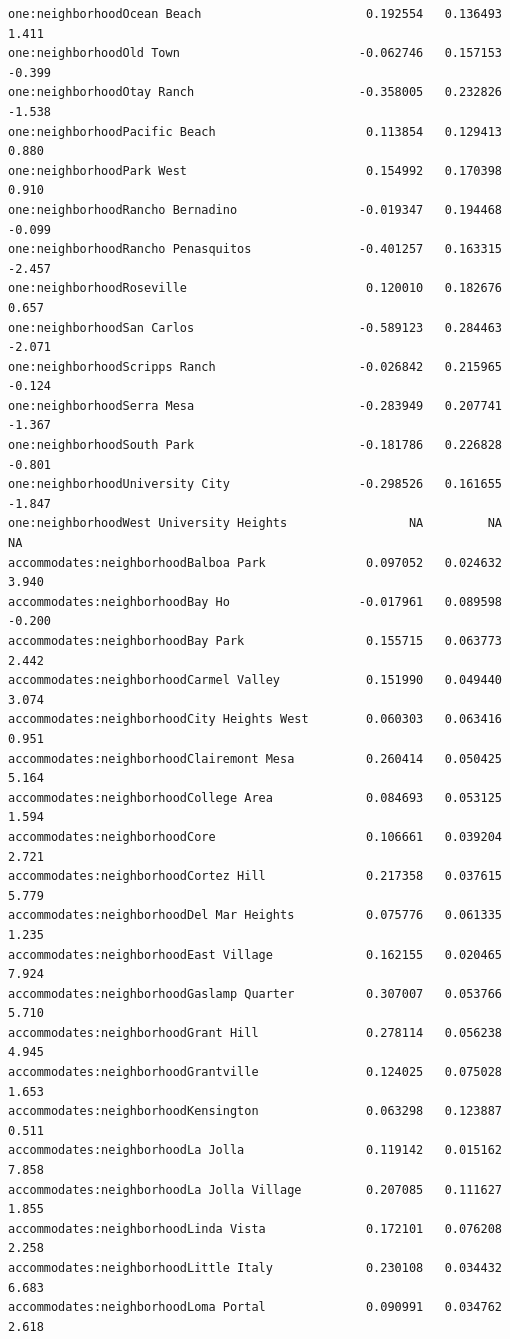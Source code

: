 \documentclass[
  letterpaper,
  DIV=11,
  numbers=noendperiod,
  oneside]{scrreprt}
\begin{document}
\begin{verbatim}
one:neighborhoodOcean Beach                       0.192554   0.136493   1.411
one:neighborhoodOld Town                         -0.062746   0.157153  -0.399
one:neighborhoodOtay Ranch                       -0.358005   0.232826  -1.538
one:neighborhoodPacific Beach                     0.113854   0.129413   0.880
one:neighborhoodPark West                         0.154992   0.170398   0.910
one:neighborhoodRancho Bernadino                 -0.019347   0.194468  -0.099
one:neighborhoodRancho Penasquitos               -0.401257   0.163315  -2.457
one:neighborhoodRoseville                         0.120010   0.182676   0.657
one:neighborhoodSan Carlos                       -0.589123   0.284463  -2.071
one:neighborhoodScripps Ranch                    -0.026842   0.215965  -0.124
one:neighborhoodSerra Mesa                       -0.283949   0.207741  -1.367
one:neighborhoodSouth Park                       -0.181786   0.226828  -0.801
one:neighborhoodUniversity City                  -0.298526   0.161655  -1.847
one:neighborhoodWest University Heights                 NA         NA      NA
accommodates:neighborhoodBalboa Park              0.097052   0.024632   3.940
accommodates:neighborhoodBay Ho                  -0.017961   0.089598  -0.200
accommodates:neighborhoodBay Park                 0.155715   0.063773   2.442
accommodates:neighborhoodCarmel Valley            0.151990   0.049440   3.074
accommodates:neighborhoodCity Heights West        0.060303   0.063416   0.951
accommodates:neighborhoodClairemont Mesa          0.260414   0.050425   5.164
accommodates:neighborhoodCollege Area             0.084693   0.053125   1.594
accommodates:neighborhoodCore                     0.106661   0.039204   2.721
accommodates:neighborhoodCortez Hill              0.217358   0.037615   5.779
accommodates:neighborhoodDel Mar Heights          0.075776   0.061335   1.235
accommodates:neighborhoodEast Village             0.162155   0.020465   7.924
accommodates:neighborhoodGaslamp Quarter          0.307007   0.053766   5.710
accommodates:neighborhoodGrant Hill               0.278114   0.056238   4.945
accommodates:neighborhoodGrantville               0.124025   0.075028   1.653
accommodates:neighborhoodKensington               0.063298   0.123887   0.511
accommodates:neighborhoodLa Jolla                 0.119142   0.015162   7.858
accommodates:neighborhoodLa Jolla Village         0.207085   0.111627   1.855
accommodates:neighborhoodLinda Vista              0.172101   0.076208   2.258
accommodates:neighborhoodLittle Italy             0.230108   0.034432   6.683
accommodates:neighborhoodLoma Portal              0.090991   0.034762   2.618

\end{verbatim}
\end{document}
